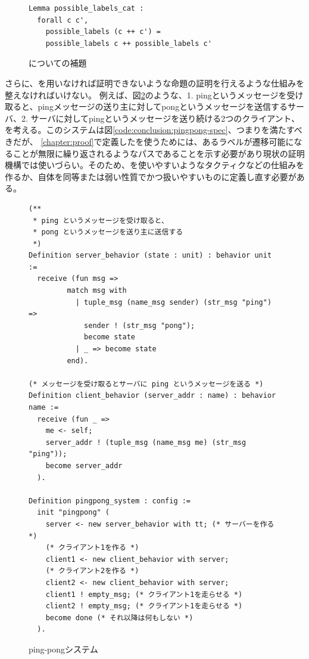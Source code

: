 \begin{figure}[tp]
\begin{lstlisting}
Lemma possible_labels_cat :
  forall c c',
    possible_labels (c ++ c') =
    possible_labels c ++ possible_labels c'
\end{lstlisting}
\label{code:conclusion:possible-labels-cat}
\caption{についての補題}
\end{figure}


さらに、\fairness を用いなければ証明できないような命題の証明を行えるような仕組みを整えなければいけない。
例えば、図\ref{code:conclusion:pingpong}のような、1. pingというメッセージを受け取ると、pingメッセージの送り主に対してpongというメッセージを送信するサーバ、2. サーバに対してpingというメッセージを送り続ける2つのクライアント、を考える。このシステムは図\ref{code:conclusion:pingpong-spec}、つまりを満たすべきだが、
\ref{chapter:proof}で定義したを使うためには、あるラベルが遷移可能になることが無限に繰り返されるようなパスであることを示す必要があり現状の証明機構では使いづらい。そのため、を使いやすいようなタクティクなどの仕組みを作るか、自体を同等または弱い性質でかつ扱いやすいものに定義し直す必要がある。

\begin{figure}[tp]
  \begin{lstlisting}
(**
 * ping というメッセージを受け取ると、
 * pong というメッセージを送り主に送信する
 *)
Definition server_behavior (state : unit) : behavior unit :=
  receive (fun msg =>
         match msg with
           | tuple_msg (name_msg sender) (str_msg "ping") =>
             sender ! (str_msg "pong");
             become state
           | _ => become state
         end).

(* メッセージを受け取るとサーバに ping というメッセージを送る *)
Definition client_behavior (server_addr : name) : behavior name :=
  receive (fun _ =>
    me <- self;
    server_addr ! (tuple_msg (name_msg me) (str_msg "ping"));
    become server_addr
  ).

Definition pingpong_system : config :=
  init "pingpong" (
    server <- new server_behavior with tt; (* サーバーを作る *)
    (* クライアント1を作る *)
    client1 <- new client_behavior with server;
    (* クライアント2を作る *)
    client2 <- new client_behavior with server;
    client1 ! empty_msg; (* クライアント1を走らせる *)
    client2 ! empty_msg; (* クライアント1を走らせる *)
    become done (* それ以降は何もしない *)
  ).
  \end{lstlisting}
  \label{code:conclusion:pingpong}
  \caption{ping-pongシステム}
\end{figure}

